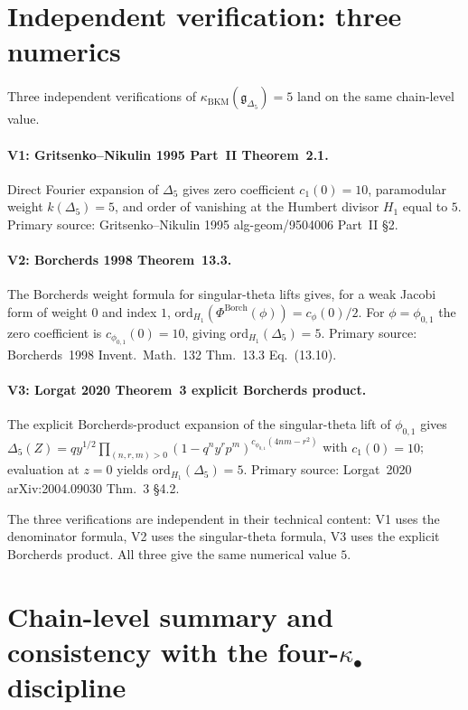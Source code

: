 \section*{Independent verification: three numerics}

Three independent verifications of $\kappa_{\mathrm{BKM}}
(\mathfrak{g}_{\Delta_5}) = 5$ land on the same chain-level value.

\paragraph{V1: Gritsenko--Nikulin 1995 Part~II Theorem~2.1.}
Direct Fourier expansion of $\Delta_5$ gives zero coefficient
$c_1(0) = 10$, paramodular weight $k(\Delta_5) = 5$, and order of
vanishing at the Humbert divisor $H_1$ equal to $5$. Primary source:
Gritsenko--Nikulin 1995 alg-geom/9504006 Part~II §2.

\paragraph{V2: Borcherds 1998 Theorem~13.3.}
The Borcherds weight formula for singular-theta lifts gives, for a
weak Jacobi form of weight $0$ and index $1$,
$\mathrm{ord}_{H_1}(\Phi^{\mathrm{Borch}}(\phi)) = c_\phi(0)/2$. For
$\phi = \phi_{0,1}$ the zero coefficient is $c_{\phi_{0,1}}(0) = 10$,
giving $\mathrm{ord}_{H_1}(\Delta_5) = 5$. Primary source:
Borcherds~1998 Invent.~Math.~132 Thm.~13.3 Eq.~(13.10).

\paragraph{V3: Lorgat 2020 Theorem~3 explicit Borcherds product.}
The explicit Borcherds-product expansion of the singular-theta lift
of $\phi_{0,1}$ gives $\Delta_5(Z) = q y^{1/2} \prod_{(n,r,m)>0}
(1 - q^n y^r p^m)^{c_{\phi_{0,1}}(4nm - r^2)}$ with $c_1(0) = 10$;
evaluation at $z = 0$ yields $\mathrm{ord}_{H_1}(\Delta_5) = 5$. Primary
source: Lorgat~2020 arXiv:2004.09030 Thm.~3 §4.2.

The three verifications are independent in their technical content:
V1 uses the denominator formula, V2 uses the singular-theta formula,
V3 uses the explicit Borcherds product. All three give the same
numerical value $5$.

\section*{Chain-level summary and consistency with the
four-$\kappa_\bullet$ discipline}

